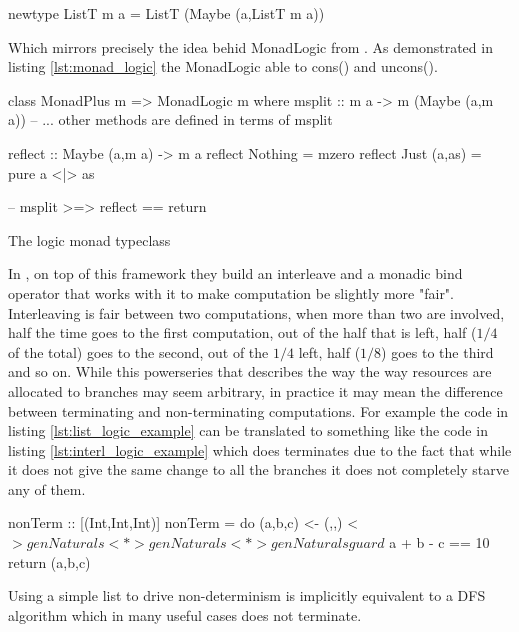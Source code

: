 \begin{haskellcode}
newtype ListT m a = ListT (Maybe (a,ListT m a))
\end{haskellcode}

Which mirrors precisely the idea behid MonadLogic from
\cite{kiselyovBacktrackingInterleavingTerminating}. As demonstrated in
listing \ref{lst:monad_logic} the MonadLogic able to cons()
and uncons().

\begin{code}
\begin{haskellcode}
class MonadPlus m => MonadLogic m where
  msplit :: m a -> m (Maybe (a,m a))
  -- ... other methods are defined in terms of msplit

reflect :: Maybe (a,m a) -> m a
reflect Nothing = mzero
reflect Just (a,as) = pure a <|> as

-- msplit >=> reflect == return
\end{haskellcode}
  \caption{\label{lst:monad_logic}The logic monad typeclass}
\end{code}

In \cite{kiselyovBacktrackingInterleavingTerminating}, on top of this
framework they build an interleave and a monadic bind operator that
works with it to make computation be slightly more "fair".
Interleaving is fair between two computations, when more than two are
involved, half the time goes to the first computation, out of the half
that is left, half (\(1/4\) of the total) goes to the second, out of the
\(1/4\) left, half (\(1/8\)) goes to the third and so on. While this
powerseries that describes the way the way resources are allocated to
branches may seem arbitrary, in practice it may mean the difference
between terminating and non-terminating computations. For example the
code in listing \ref{lst:list_logic_example} can be translated to something like the
code in listing \ref{lst:interl_logic_example} which does terminates due to the fact that
while it does not give the same change to all the branches it does not
completely starve any of them.

\begin{code}
\begin{haskellcode}
nonTerm :: [(Int,Int,Int)]
nonTerm = do
  (a,b,c) <- (,,) <$> genNaturals <*> genNaturals <*> genNaturals
  guard $ a + b - c == 10
  return (a,b,c)
\end{haskellcode}
  \caption{\label{lst:list_logic_example}Using a simple list to drive
    non-determinism is implicitly equivalent to a DFS algorithm which
    in many useful cases does not terminate.}
\end{code}

